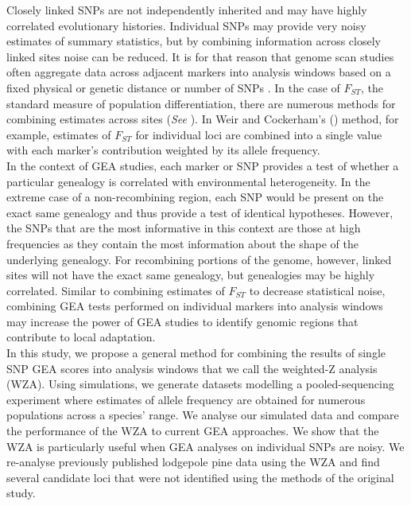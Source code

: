 \documentclass[10pt,twoside,lineno, twocolumn]{GSA_format}
\begin{document}
Closely linked SNPs are not independently inherited and may have highly correlated evolutionary histories. Individual SNPs may provide very noisy estimates of summary statistics, but by combining information across closely linked sites noise can be reduced. It is for that reason that genome scan studies often aggregate data across adjacent markers into analysis windows based on a fixed physical or genetic distance or number of SNPs \citep{Hoban2016}. In the case of $F_{ST}$, the standard measure of population differentiation, there are numerous methods for combining estimates across sites (\textit{See} \citealt{Bhatia2013}). In Weir and Cockerham's (\citeyear{Weir1984-tc}) method, for example, estimates of $F_{ST}$ for individual loci are combined into a single value with each marker's contribution weighted by its allele frequency. \\

In the context of GEA studies, each marker or SNP provides a test of whether a particular genealogy is correlated with environmental heterogeneity. In the extreme case of a non-recombining region, each SNP would be present on the exact same genealogy and thus provide a test of identical hypotheses. However, the SNPs that are the most informative in this context are those at high frequencies as they contain the most information about the shape of the underlying genealogy. For recombining portions of the genome, however, linked sites will not have the exact same genealogy, but genealogies may be highly correlated. Similar to combining estimates of $F_{ST}$ to decrease statistical noise, combining GEA tests performed on individual markers into analysis windows may increase the power of GEA studies to identify genomic regions that contribute to local adaptation. \\

In this study, we propose a general method for combining the results of single SNP GEA scores into analysis windows that we call the weighted-Z analysis (WZA). Using simulations, we generate datasets modelling a pooled-sequencing experiment where estimates of allele frequency are obtained for numerous populations across a species' range. We analyse our simulated data and compare the performance of the WZA to current GEA approaches. We show that the WZA is particularly useful when GEA analyses on individual SNPs are noisy. We re-analyse previously published lodgepole pine data using the WZA and find several candidate loci that were not identified using the methods of the original study. 
\end{document}

